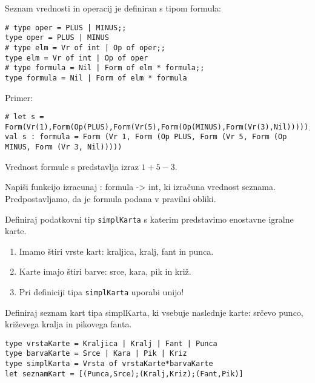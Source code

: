 \begin{ex}
Seznam vrednosti in operacij je definiran s tipom formula: 

\begin{lstlisting}
# type oper = PLUS | MINUS;; 
type oper = PLUS | MINUS 
# type elm = Vr of int | Op of oper;; 
type elm = Vr of int | Op of oper 
# type formula = Nil | Form of elm * formula;; 
type formula = Nil | Form of elm * formula 
\end{lstlisting}

Primer: 
\begin{lstlisting}
# let s = Form(Vr(1),Form(Op(PLUS),Form(Vr(5),Form(Op(MINUS),Form(Vr(3),Nil)))));;
val s : formula = Form (Vr 1, Form (Op PLUS, Form (Vr 5, Form (Op MINUS, Form (Vr 3, Nil))))) 
\end{lstlisting}
Vrednost formule s predstavlja izraz $1+5-3$. 

Napi\v si funkcijo izracunaj : formula -> int, ki izra\v cuna vrednost seznama. Predpostavljamo, da je formula podana v pravilni obliki.
\end{ex}



\begin{ex}
Definiraj podatkovni tip \lstinline{simplKarta} s katerim predstavimo enostavne igralne karte. 
\begin{enumerate}
\item Imamo \v stiri vrste kart: kraljica, kralj, fant in punca. 
\item Karte imajo \v stiri barve: srce, kara, pik in kri\v z. 
\item Pri definiciji tipa \lstinline{simplKarta} uporabi unijo!
\end{enumerate}

Definiraj seznam kart tipa simplKarta, ki vsebuje naslednje karte: sr\v cevo punco, kri\v zevega kralja in pikovega fanta. 

\begin{sol}
\begin{lstlisting}
type vrstaKarte = Kraljica | Kralj | Fant | Punca
type barvaKarte = Srce | Kara | Pik | Kriz
type simplKarta = Vrsta of vrstaKarte*barvaKarte
let seznamKart = [(Punca,Srce);(Kralj,Kriz);(Fant,Pik)]
\end{lstlisting}
\end{sol}
\end{ex}




